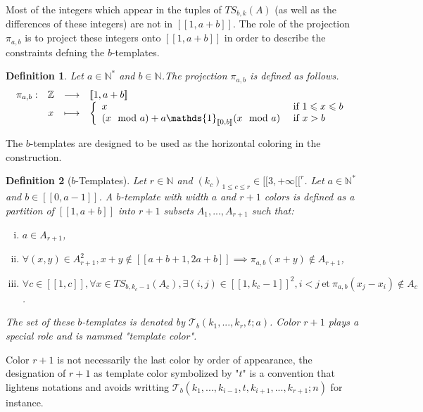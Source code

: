 \documentclass{article}
\newtheorem{definition}{Definition}[section]
\newcommand{\TS}{\mathit{TS}}
\begin{document}
Most of the integers which appear in the tuples of \(\TS_{b,k}(A)\) (as well as the differences of these integers) are 
not in \([\![1, a + b]\!]\). The role of the projection \(\pi_{a, b}\) is to project these integers onto 
\([\![1, a + b]\!]\) in order to describe the constraints defning the \(b\)-templates.

\begin{definition}
Let \(a \in \mathbb{N}^*\) and \(b \in \mathbb{N}\).The projection \(\pi_{a, b}\) is defined as follows.
\[ \begin{array}{c c c l}
	\pi_{a, b} : & \mathbb{Z} & \longrightarrow & [\![1, a + b]\!] \\
	 & x & \longmapsto & 
		\left\{
		\begin{array}{l l}
			x & ~\text{if}~ 1 \leqslant x \leqslant b \\
			(x \mod a) + a \mathds{1}_{[\![0, b]\!]}(x \mod a) & ~\text{if}~ x > b
		\end{array}
		\right.
\end{array} \]
\end{definition}

The \(b\)-templates are designed to be used as the horizontal coloring in the construction.

\begin{definition}[\(b\)-Templates]
Let \(r \in \mathbb{N}\) and \((k_c)_{1 \leqslant c \leqslant r} \in {[\![3, +\infty[\![}^r\). Let 
\(a \in \mathbb{N}^*\) and \(b \in [\![0, a - 1]\!]\).  A \(b\)-template with width \(a\) and \(r + 1\) colors is 
defined as a partition of \([\![1, a + b]\!]\) into \(r+1\) subsets \(A_1, ..., A_{r+1}\) such that:
\begin{enumerate}[(i)]
\item \(a \in A_{r+1}\),
\item \(\forall (x, y) \in A_{r + 1}^2, x + y \notin [\![a + b + 1, 2 a + b]\!] \implies \pi_{a, b}(x + y) \notin 
	A_{r + 1}\),
\item \(\forall c \in [\![1, c]\!], \forall x \in \TS_{b, k_c - 1}(A_c), \exists (i, j) \in {[\![1, k_c - 1]\!]}^2, i < 
	j ~\text{et}~ \pi_{a, b}(x_j - x_i) \notin A_c\).
\end{enumerate}
The set of these \(b\)-templates is denoted by \(\mathcal{T}_b(k_1, ..., k_r, t; a)\).  Color \(r + 1\) plays a special 
role and is nammed "template color".
\end{definition}

Color \(r + 1\)  is not necessarily the last color by order of appearance, the designation of \(r+1\) as template color 
symbolized by "\(t\)" is a convention that lightens notations and avoids writting 
\(\mathcal{T}_b(k_1, ..., k_{i - 1}, t,  k_{i + 1}, ..., k_{r + 1}; n)\) for instance.
\end{document}

